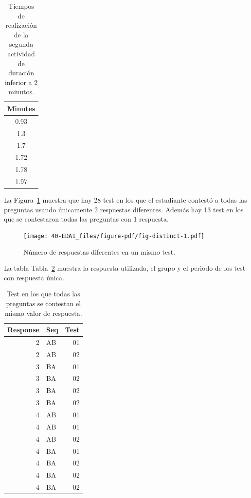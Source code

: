 \documentclass[
  12pt,
  a4paper,
  extrafontsizes,
  onecolumn,
  openright]{memoir}
\begin{document}
\hypertarget{tbl-washout}{}
\begin{longtable}{c}
\caption{\label{tbl-washout}Tiempos de realización de la segunda actividad de duración inferior a 2
minutos. }\tabularnewline

\toprule
Minutes \\ 
\midrule
0.93 \\ 
1.3 \\ 
1.7 \\ 
1.72 \\ 
1.78 \\ 
1.97 \\ 
\bottomrule
\end{longtable}

La Figura~\ref{fig-distinct} muestra que hay 28 test en los que el
estudiante contestó a todas las preguntas usando únicamente 2 respuestas
diferentes. Además hay 13 test en los que se contestaron todas las
preguntas con 1 respuesta.

\begin{figure}[h]

{\centering \texttt{[image: 40-EDA1\_files/figure-pdf/fig-distinct-1.pdf]}

}

\caption{\label{fig-distinct}Número de respuestas diferentes en un mismo
test.}

\end{figure}

\clearpage

La tabla Tabla~\ref{tbl-distinct2} muestra la respuesta utilizada, el
grupo y el periodo de los test con respuesta única.

\hypertarget{tbl-distinct2}{}
\begin{longtable}{rlr}
\caption{\label{tbl-distinct2}Test en los que todas las preguntas se contestan el mismo valor de
respuesta. }\tabularnewline

\toprule
Response & Seq & Test \\ 
\midrule
2 & AB & 01 \\ 
2 & AB & 02 \\ 
3 & BA & 01 \\ 
3 & BA & 02 \\ 
3 & BA & 02 \\ 
3 & BA & 02 \\ 
4 & AB & 01 \\ 
4 & AB & 01 \\ 
4 & AB & 02 \\ 
4 & BA & 01 \\ 
4 & BA & 02 \\ 
4 & BA & 02 \\ 
4 & BA & 02 \\ 
\bottomrule
\end{longtable}
\end{document}
